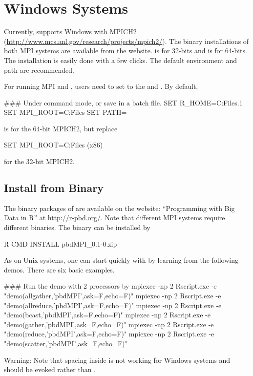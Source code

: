 

\section[Windows Systems]{Windows Systems}
\label{sec:windows_systems}

Currently,  supports Windows with
MPICH2 (\url{http://www.mcs.anl.gov/research/projects/mpich2/}).
The binary installations of both MPI systems are available
from the website.
 is for 32-bits and
 is for 64-bits.
The installation is easily done with a few clicks. The
default environment and path are recommended.

For running MPI and , users need to set  to the
 and . By default,
\begin{Command}
### Under command mode, or save in a batch file.
SET R_HOME=C:\Program Files\R{}.1
SET MPI_ROOT=C:\Program Files
SET PATH=%
\end{Command}
is for the 64-bit MPICH2, but replace
\begin{Command}
SET MPI_ROOT=C:\Program Files (x86)
\end{Command}
for the 32-bit MPICH2.


\subsection[Install from Binary]{Install from Binary}
\label{sec:install_from_binary}

The binary packages of  are available on the website:
``Programming with Big Data in R'' at
\url{http://r-pbd.org/}.
Note that different MPI systems require different binaries.
The binary can be installed by
\begin{Command}
R CMD INSTALL pbdMPI_0.1-0.zip
\end{Command}

As on Unix systems,
one can start quickly with  by learning from the
following demos. There are six basic examples.
\begin{Command}
### Run the demo with 2 processors by
mpiexec -np 2 Rscript.exe -e "demo(allgather,'pbdMPI',ask=F,echo=F)"
mpiexec -np 2 Rscript.exe -e "demo(allreduce,'pbdMPI',ask=F,echo=F)"
mpiexec -np 2 Rscript.exe -e "demo(bcast,'pbdMPI',ask=F,echo=F)"
mpiexec -np 2 Rscript.exe -e "demo(gather,'pbdMPI',ask=F,echo=F)"
mpiexec -np 2 Rscript.exe -e "demo(reduce,'pbdMPI',ask=F,echo=F)"
mpiexec -np 2 Rscript.exe -e "demo(scatter,'pbdMPI',ask=F,echo=F)"
\end{Command}
{\color{red}Warning:}
Note that spacing inside  is not working for Windows systems
and  should be evoked rather than .



